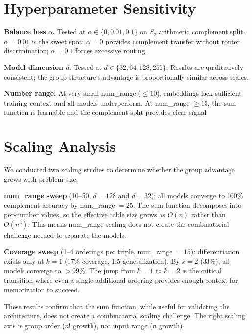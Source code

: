 \documentclass[10pt, letterpaper]{article}
\begin{document}
\section{Hyperparameter Sensitivity}

\textbf{Balance loss $\alpha$.} Tested at $\alpha \in \{0, 0.01, 0.1\}$ on $S_2$ arithmetic complement split. $\alpha = 0.01$ is the sweet spot: $\alpha = 0$ provides complement transfer without router discrimination; $\alpha = 0.1$ forces excessive routing.

\textbf{Model dimension $d$.} Tested at $d \in \{32, 64, 128, 256\}$. Results are qualitatively consistent; the group structure's advantage is proportionally similar across scales.

\textbf{Number range.} At very small num\_range ($\leq 10$), embeddings lack sufficient training context and all models underperform. At num\_range $\geq 15$, the sum function is learnable and the complement split provides clear signal.

\section{Scaling Analysis}
\label{app:scaling}

We conducted two scaling studies to determine whether the group advantage grows with problem size.

\textbf{num\_range sweep} (10--50, $d = 128$ and $d = 32$): all models converge to 100\% complement accuracy by num\_range $= 25$. The sum function decomposes into per-number values, so the effective table size grows as $O(n)$ rather than $O(n^3)$. This means num\_range scaling does not create the combinatorial challenge needed to separate the models.

\textbf{Coverage sweep} (1--4 orderings per triple, num\_range $= 15$): differentiation exists only at $k = 1$ (17\% coverage, 1:5 generalization). By $k = 2$ (33\%), all models converge to $>$99\%. The jump from $k = 1$ to $k = 2$ is the critical transition where even a single additional ordering provides enough context for memorization to succeed.

These results confirm that the sum function, while useful for validating the architecture, does not create a combinatorial scaling challenge. The right scaling axis is group order ($n!$ growth), not input range ($n$ growth).
\end{document}
